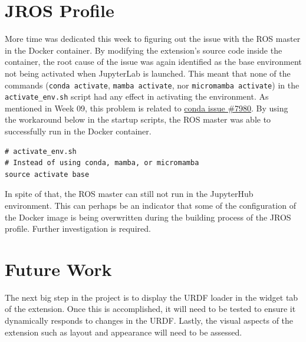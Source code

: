 \section{JROS Profile}

    More time was dedicated this week to figuring out the issue with the ROS master in the Docker container. By modifying the extension's source code inside the container, the root cause of the issue was again identified as the base environment not being activated when JupyterLab is launched. This meant that none of the commands (\texttt{conda activate}, \texttt{mamba activate}, nor \texttt{micromamba activate}) in the \texttt{activate\_env.sh} script had any effect in activating the environment. As mentioned in Week 09, this problem is related to \href{https://github.com/conda/conda/issues/7980}{conda issue \#7980}. By using the workaround below in the startup scripts, the ROS master was able to successfully run in the Docker container.

    \begin{lstlisting}
# activate_env.sh
# Instead of using conda, mamba, or micromamba
source activate base
    \end{lstlisting}

    \noindent In spite of that, the ROS master can still not run in the JupyterHub environment. This can perhaps be an indicator that some of the configuration of the Docker image is being overwritten during the building process of the JROS profile. Further investigation is required.

\section{Future Work}

    The next big step in the project is to display the URDF loader in the widget tab of the extension. Once this is accomplished, it will need to be tested to ensure it dynamically responds to changes in the URDF. Lastly, the visual aspects of the extension such as layout and appearance will need to be assessed.


